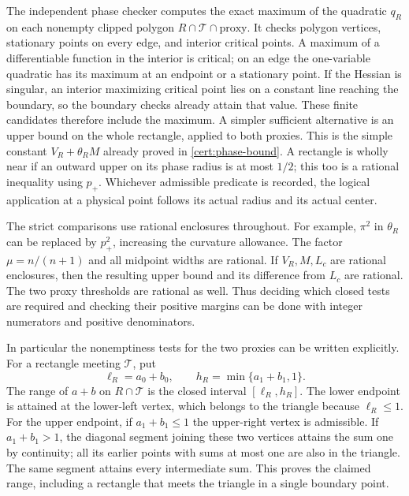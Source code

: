 The independent phase checker computes the exact maximum of the quadratic $q_R$ on each
nonempty clipped polygon $R\cap\mathcal T\cap\text{proxy}$.
It checks polygon vertices, stationary points on every edge, and
interior critical points. A maximum of a differentiable function in
the interior is critical; on an edge the one-variable quadratic has
its maximum at an endpoint or a stationary point. If the Hessian is
singular, an interior maximizing critical point lies on a constant
line reaching the boundary, so the boundary checks already attain
that value. These finite candidates therefore include the maximum.
A simpler sufficient alternative is an upper bound on the whole
rectangle, applied to both proxies. This is the simple constant $V_R+\theta_RM$ already proved
in \eqref{cert:phase-bound}. A rectangle is wholly near if an outward
upper on its phase radius is at most $1/2$; this too is a rational
inequality using $p_+$. Whichever admissible predicate is recorded,
the logical application at a physical point follows its actual
radius and its actual center.

The strict comparisons use rational enclosures throughout. For
example, $\pi^2$ in $\theta_R$ can be replaced by $p_+^2$,
increasing the curvature allowance. The factor $\mu=n/(n+1)$ and all
midpoint widths are rational. If $V_R,M,L_c$ are rational enclosures,
then the resulting upper bound and its difference from $L_c$ are
rational. The two proxy thresholds are rational as well. Thus deciding
which closed tests are required and checking their positive margins
can be done with integer numerators and positive denominators.

In particular the nonemptiness tests for the two proxies can be
written explicitly. For a rectangle meeting $\mathcal T$, put
\[
 \ell_R=a_0+b_0,\qquad h_R=\min\{a_1+b_1,1\}.
\]
The range of $a+b$ on $R\cap\mathcal T$ is the closed interval
$[\ell_R,h_R]$. The lower endpoint is attained at the lower-left
vertex, which belongs to the triangle because $\ell_R\leq1$.
For the upper endpoint, if $a_1+b_1\leq1$ the upper-right vertex
is admissible. If $a_1+b_1>1$, the diagonal segment joining these
two vertices attains the sum one by continuity; all its earlier
points with sums at most one are also in the triangle. The same
segment attains every intermediate sum. This proves the claimed
range, including a rectangle that meets the triangle in a single
boundary point.

